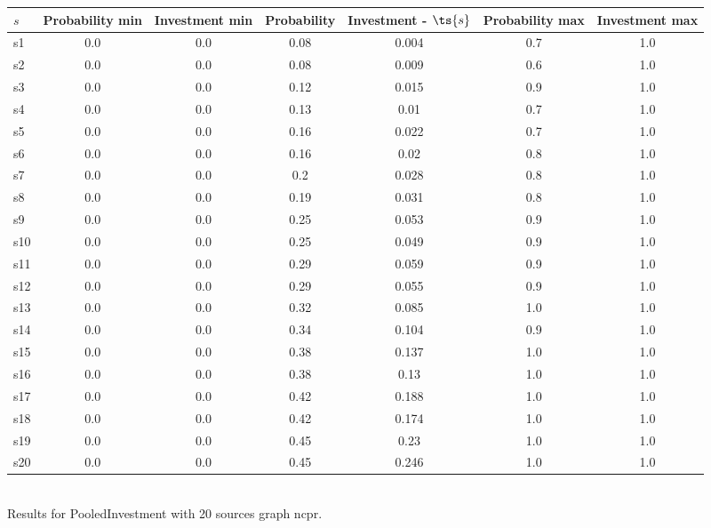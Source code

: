 \documentclass{article}
\begin{document}
\noindent\begin{tabular}{|l|c|c|c|c|c|c|}
\hline
$s$& Probability min & Investment min & Probability & Investment - $\ts{s}$ & Probability max & Investment max\\
\hline
s1 &0.0 & 0.0 & 0.08 & 0.004 & 0.7 & 1.0\\
\hline
s2 &0.0 & 0.0 & 0.08 & 0.009 & 0.6 & 1.0\\
\hline
s3 &0.0 & 0.0 & 0.12 & 0.015 & 0.9 & 1.0\\
\hline
s4 &0.0 & 0.0 & 0.13 & 0.01 & 0.7 & 1.0\\
\hline
s5 &0.0 & 0.0 & 0.16 & 0.022 & 0.7 & 1.0\\
\hline
s6 &0.0 & 0.0 & 0.16 & 0.02 & 0.8 & 1.0\\
\hline
s7 &0.0 & 0.0 & 0.2 & 0.028 & 0.8 & 1.0\\
\hline
s8 &0.0 & 0.0 & 0.19 & 0.031 & 0.8 & 1.0\\
\hline
s9 &0.0 & 0.0 & 0.25 & 0.053 & 0.9 & 1.0\\
\hline
s10 &0.0 & 0.0 & 0.25 & 0.049 & 0.9 & 1.0\\
\hline
s11 &0.0 & 0.0 & 0.29 & 0.059 & 0.9 & 1.0\\
\hline
s12 &0.0 & 0.0 & 0.29 & 0.055 & 0.9 & 1.0\\
\hline
s13 &0.0 & 0.0 & 0.32 & 0.085 & 1.0 & 1.0\\
\hline
s14 &0.0 & 0.0 & 0.34 & 0.104 & 0.9 & 1.0\\
\hline
s15 &0.0 & 0.0 & 0.38 & 0.137 & 1.0 & 1.0\\
\hline
s16 &0.0 & 0.0 & 0.38 & 0.13 & 1.0 & 1.0\\
\hline
s17 &0.0 & 0.0 & 0.42 & 0.188 & 1.0 & 1.0\\
\hline
s18 &0.0 & 0.0 & 0.42 & 0.174 & 1.0 & 1.0\\
\hline
s19 &0.0 & 0.0 & 0.45 & 0.23 & 1.0 & 1.0\\
\hline
s20 &0.0 & 0.0 & 0.45 & 0.246 & 1.0 & 1.0\\
\hline
\end{tabular}\\

\noindent Results for PooledInvestment with 20 sources graph ncpr.
\end{document}
